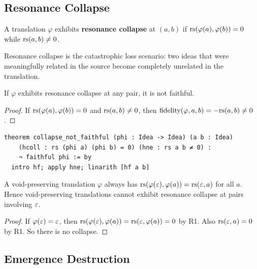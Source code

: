 \subsection{Resonance Collapse}

\begin{definition}
\label{def:resonance-collapse}
A translation $\varphi$ exhibits \textbf{resonance collapse} at $(a, b)$ if
$\mathrm{rs}(\varphi(a), \varphi(b)) = 0$ while $\mathrm{rs}(a, b) \neq 0$.
\end{definition}

Resonance collapse is the catastrophic loss scenario: two ideas that were
meaningfully related in the source become completely unrelated in the
translation.

\begin{theorem}
\label{thm:collapse-not-faithful}
If $\varphi$ exhibits resonance collapse at any pair, it is not faithful.
\end{theorem}

\begin{proof}
If $\mathrm{rs}(\varphi(a), \varphi(b)) = 0$ and $\mathrm{rs}(a, b) \neq 0$, then
$\mathrm{fidelity}(\varphi, a, b) = -\mathrm{rs}(a, b) \neq 0$.
\end{proof}

\begin{lstlisting}
theorem collapse_not_faithful (phi : Idea -> Idea) (a b : Idea)
    (hcoll : rs (phi a) (phi b) = 0) (hne : rs a b ≠ 0) :
    ¬ faithful phi := by
  intro hf; apply hne; linarith [hf a b]
\end{lstlisting}

\begin{theorem}
\label{thm:collapse-void}
A void-preserving translation $\varphi$ always has
$\mathrm{rs}(\varphi(\varepsilon), \varphi(a)) = \mathrm{rs}(\varepsilon, a)$ for all $a$.
Hence void-preserving translations cannot exhibit resonance collapse
at pairs involving $\varepsilon$.
\end{theorem}

\begin{proof}
If $\varphi(\varepsilon) = \varepsilon$, then
$\mathrm{rs}(\varphi(\varepsilon), \varphi(a)) = \mathrm{rs}(\varepsilon, \varphi(a)) = 0$ by R1.
Also $\mathrm{rs}(\varepsilon, a) = 0$ by R1.  So there is no collapse.
\end{proof}

\subsection{Emergence Destruction}

